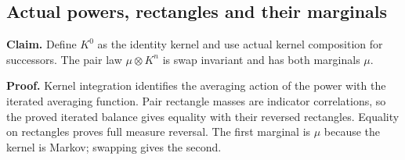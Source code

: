 \documentclass[11pt,a4paper]{report}
\begin{document}
\subsection{\texorpdfstring{Actual powers, rectangles and their marginals}{Actual powers, rectangles and their marginals}}
\label{report-step-WassersteinMixing-SemigroupPowers-lean-2}


\textbf{Claim.} Define \(K^0\) as the identity kernel and use actual kernel composition for successors. The pair law \(\mu\otimes K^n\) is swap invariant and has both marginals \(\mu\).



\textbf{Proof.} Kernel integration identifies the averaging action of the power with the iterated averaging function. Pair rectangle masses are indicator correlations, so the proved iterated balance gives equality with their reversed rectangles. Equality on rectangles proves full measure reversal. The first marginal is \(\mu\) because the kernel is Markov; swapping gives the second.
\end{document}
